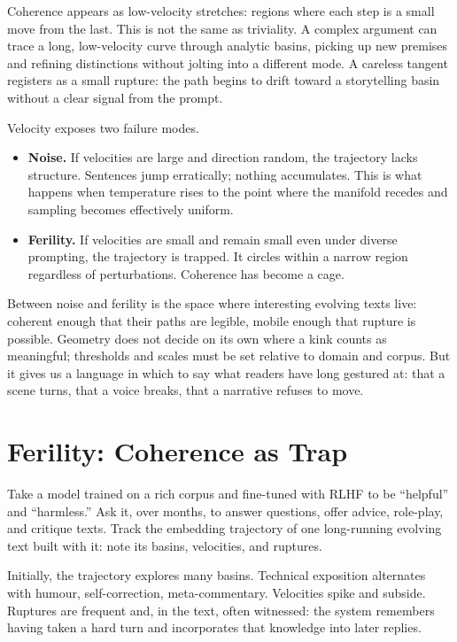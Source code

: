 \documentclass[12pt,a4paper]{article}
\begin{document}
Coherence appears as low-velocity stretches: regions where each step is a small move from the last. This is not the same as triviality. A complex argument can trace a long, low-velocity curve through analytic basins, picking up new premises and refining distinctions without jolting into a different mode. A careless tangent registers as a small rupture: the path begins to drift toward a storytelling basin without a clear signal from the prompt.

Velocity exposes two failure modes.

\begin{itemize}
  \item \textbf{Noise.} If velocities are large and direction random, the trajectory lacks structure. Sentences jump erratically; nothing accumulates. This is what happens when temperature rises to the point where the manifold recedes and sampling becomes effectively uniform.

  \item \textbf{Ferility.} If velocities are small and remain small even under diverse prompting, the trajectory is trapped. It circles within a narrow region regardless of perturbations. Coherence has become a cage.
\end{itemize}

Between noise and ferility is the space where interesting evolving texts live: coherent enough that their paths are legible, mobile enough that rupture is possible. Geometry does not decide on its own where a kink counts as meaningful; thresholds and scales must be set relative to domain and corpus. But it gives us a language in which to say what readers have long gestured at: that a scene turns, that a voice breaks, that a narrative refuses to move.


\section{Ferility: Coherence as Trap}

Take a model trained on a rich corpus and fine-tuned with RLHF to be ``helpful'' and ``harmless.'' Ask it, over months, to answer questions, offer advice, role-play, and critique texts. Track the embedding trajectory of one long-running evolving text built with it: note its basins, velocities, and ruptures.

Initially, the trajectory explores many basins. Technical exposition alternates with humour, self-correction, meta-commentary. Velocities spike and subside. Ruptures are frequent and, in the text, often witnessed: the system remembers having taken a hard turn and incorporates that knowledge into later replies.
\end{document}

